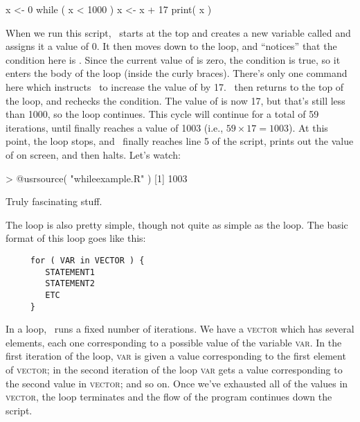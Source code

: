 \begin{script}
x <- 0
while ( x < 1000 ) {
  x <- x + 17
}
print( x )
\end{script}
When we run this script, \R\ starts at the top and creates a new variable called  and assigns it a value of 0. It then moves down to the loop, and ``notices'' that the condition here is . Since the current value of  is zero, the condition is true, so it enters the body of the loop (inside the curly braces). There's only one command here which instructs \R\ to increase the value of  by 17. \R\ then returns to the top of the loop, and rechecks the condition. The value of  is now 17, but that's still less than 1000, so the loop continues. This cycle will continue for a total of 59 iterations, until finally  reaches a value of 1003 (i.e., $59 \times 17 = 1003$). At this point, the loop stops, and \R\ finally reaches line 5 of the script, prints out the value of  on screen, and then halts. Let's watch:
\begin{rblock1}
> @usr{source( "whileexample.R" )}
[1] 1003
\end{rblock1}
Truly fascinating stuff.


The  loop is also pretty simple, though not quite as simple as the  loop. The basic format of this loop goes like this:
\begin{verbatim}
     for ( VAR in VECTOR ) {
        STATEMENT1
        STATEMENT2
        ETC
     }
\end{verbatim} 
In a  loop, \R\ runs a fixed number of iterations. We have a \textsc{vector} which has several elements, each one corresponding to a possible value of the variable \textsc{var}. In the first iteration of the loop, \textsc{var} is given a value corresponding to the first element of \textsc{vector}; in the second iteration of the loop \textsc{var} gets a value corresponding to the second value in \textsc{vector}; and so on. Once we've exhausted all of the values in \textsc{vector}, the loop terminates and the flow of the program continues down the script. 

